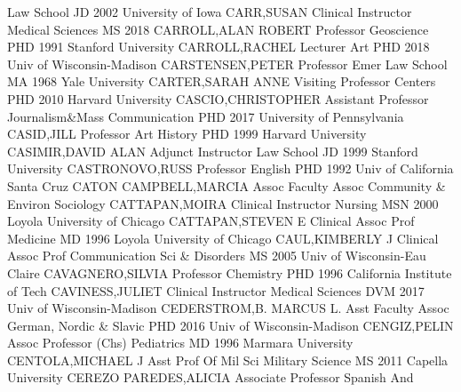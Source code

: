 \documentclass[
]{article}
\begin{document}
 \textbar Law School \textbar JD 2002 University of Iowa
\textbar CARR,SUSAN \textbar Clinical Instructor \textbar{} 
\textbar Medical Sciences \textbar MS 2018 \textbar CARROLL,ALAN ROBERT
\textbar Professor \textbar{}  \textbar Geoscience
\textbar PHD 1991 Stanford University \textbar CARROLL,RACHEL
\textbar Lecturer \textbar{}  \textbar Art \textbar PHD 2018
Univ of Wisconsin-Madison \textbar CARSTENSEN,PETER \textbar Professor
Emer \textbar{}  \textbar Law School \textbar MA 1968 Yale
University \textbar CARTER,SARAH ANNE \textbar Visiting Professor
\textbar{}  \textbar Centers \textbar PHD 2010 Harvard
University \textbar CASCIO,CHRISTOPHER \textbar Assistant Professor
\textbar{}  \textbar Journalism\&Mass Communication
\textbar PHD 2017 University of Pennsylvania \textbar CASID,JILL
\textbar Professor \textbar{}  \textbar Art History
\textbar PHD 1999 Harvard University \textbar CASIMIR,DAVID ALAN
\textbar Adjunct Instructor \textbar{}  \textbar Law School
\textbar JD 1999 Stanford University \textbar CASTRONOVO,RUSS
\textbar Professor \textbar{}  \textbar English \textbar PHD
1992 Univ of California Santa Cruz \textbar CATON CAMPBELL,MARCIA
\textbar Assoc Faculty Assoc \textbar{}  \textbar Community
\& Environ Sociology \textbar CATTAPAN,MOIRA \textbar Clinical
Instructor \textbar Nursing \textbar{}  \textbar MSN 2000
Loyola University of Chicago \textbar CATTAPAN,STEVEN E
\textbar Clinical Assoc Prof \textbar Medicine \textbar{} 
\textbar MD 1996 Loyola University of Chicago \textbar CAUL,KIMBERLY J
\textbar Clinical Assoc Prof \textbar Communication Sci \& Disorders
\textbar{}  \textbar MS 2005 Univ of Wisconsin-Eau Claire
\textbar CAVAGNERO,SILVIA \textbar Professor \textbar Chemistry
\textbar{}  \textbar PHD 1996 California Institute of Tech
\textbar CAVINESS,JULIET \textbar Clinical Instructor \textbar Medical
Sciences \textbar{}  \textbar DVM 2017 Univ of
Wisconsin-Madison \textbar CEDERSTROM,B. MARCUS L. \textbar Asst Faculty
Assoc \textbar German, Nordic \& Slavic \textbar{} 
\textbar PHD 2016 Univ of Wisconsin-Madison \textbar CENGIZ,PELIN
\textbar Assoc Professor (Chs) \textbar Pediatrics \textbar{}
 \textbar MD 1996 Marmara University \textbar CENTOLA,MICHAEL
J \textbar Asst Prof Of Mil Sci \textbar Military Science \textbar{}
 \textbar MS 2011 Capella University \textbar CEREZO
PAREDES,ALICIA \textbar Associate Professor \textbar Spanish And
\end{document}
